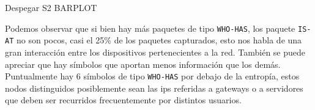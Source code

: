 Despegar S2 BARPLOT

Podemos observar que si bien hay más paquetes de tipo \texttt{WHO-HAS}, los paquete \texttt{IS-AT} no son pocos, casi el 25\% de los paquetes capturados, esto nos habla de una gran interacción entre los dispositivos pertenecientes a la red. También se puede apreciar que hay símbolos que aportan menos información que los demás. Puntualmente hay 6 símbolos de tipo \texttt{WHO-HAS} por debajo de la entropía, estos nodos distinguidos posiblemente sean las ips referidas a gateways o a servidores que deben ser recurridos frecuentemente por distintos usuarios.


